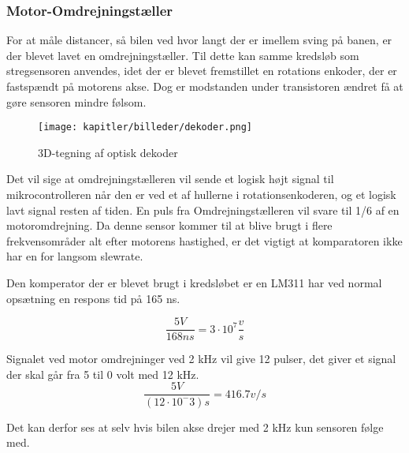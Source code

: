 \subsubsection{Motor-Omdrejningstæller}
\label{motor-omdrej}

For at måle distancer, så bilen ved hvor langt der er imellem sving på banen, er der blevet lavet en omdrejningstæller. Til dette kan samme kredsløb som stregsensoren anvendes, idet der er blevet fremstillet en rotations enkoder, der er fastspændt på motorens akse. Dog er modstanden under transistoren ændret få at gøre sensoren mindre følsom.


\begin{figure}[ht]
    \centering
    \texttt{[image: kapitler/billeder/dekoder.png]}
    \caption{3D-tegning af optisk dekoder}
    \label{fig:dekoder}
\end{figure}


Det vil sige at omdrejningstælleren vil sende et logisk højt signal til mikrocontrolleren når den er ved et af hullerne i  rotationsenkoderen, og et logisk lavt signal resten af tiden. En puls fra Omdrejningstælleren vil svare til 1/6 af en motoromdrejning.
Da denne sensor kommer til at blive brugt i flere frekvensområder alt efter motorens hastighed, er det vigtigt at komparatoren ikke har en for langsom slewrate.

Den komperator der er blevet brugt i kredsløbet er en LM311 har ved normal opsætning en respons tid på 165 ns. \cite{LM311}

\begin{equation}
\frac{5 V}{168 ns} = 3 \cdot 10^7 \frac{v}{s}
\end{equation}

Signalet ved motor omdrejninger ved 2 kHz vil give 12 pulser, det giver et signal der skal går fra 5 til 0 volt med 12 kHz.
\begin{equation}
\frac{5 V}{(12 \cdot 10^-3)s} = 416.7 v/s
\end{equation}

Det kan derfor ses at selv hvis bilen akse drejer med 2 kHz kun sensoren følge med.
